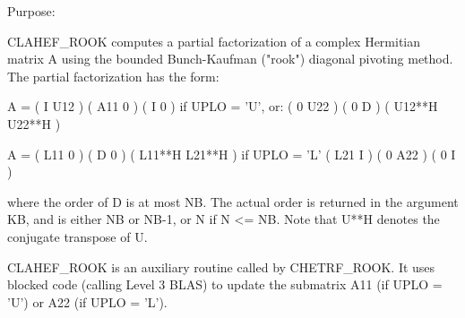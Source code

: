  

\begin{DoxyParagraph}{Purpose\+: }
\begin{DoxyVerb} CLAHEF_ROOK computes a partial factorization of a complex Hermitian
 matrix A using the bounded Bunch-Kaufman ("rook") diagonal pivoting
 method. The partial factorization has the form:

 A  =  ( I  U12 ) ( A11  0  ) (  I      0     )  if UPLO = 'U', or:
       ( 0  U22 ) (  0   D  ) ( U12**H U22**H )

 A  =  ( L11  0 ) (  D   0  ) ( L11**H L21**H )  if UPLO = 'L'
       ( L21  I ) (  0  A22 ) (  0      I     )

 where the order of D is at most NB. The actual order is returned in
 the argument KB, and is either NB or NB-1, or N if N <= NB.
 Note that U**H denotes the conjugate transpose of U.

 CLAHEF_ROOK is an auxiliary routine called by CHETRF_ROOK. It uses
 blocked code (calling Level 3 BLAS) to update the submatrix
 A11 (if UPLO = 'U') or A22 (if UPLO = 'L').\end{DoxyVerb}
 
\end{DoxyParagraph}

